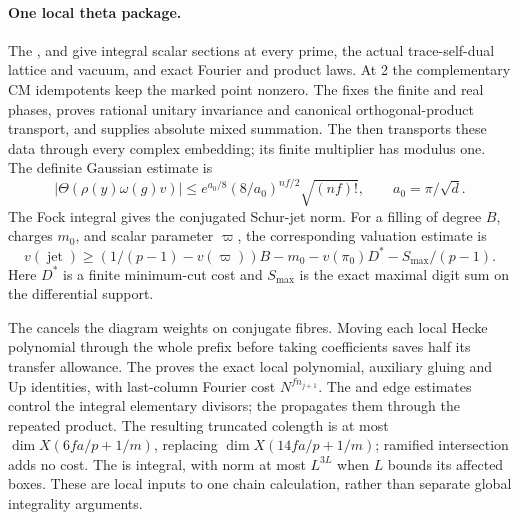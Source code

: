 \paragraph{One local theta package.}
The ,
and 
give integral scalar sections at every prime, the actual trace-self-dual
lattice and vacuum, and exact Fourier and product laws. At 2 the
complementary CM idempotents keep the marked point nonzero.
The 
fixes the finite and real phases, proves rational unitary invariance and
canonical orthogonal-product transport, and supplies absolute mixed
summation. The
then transports these data through every complex embedding; its finite
multiplier has modulus one. The definite Gaussian estimate is
\[
 |\Theta(\rho(y)\omega(g)v)|
 \le e^{a_0/8}(8/a_0)^{nf/2}\sqrt{(nf)!},
 \qquad a_0=\pi/\sqrt d.
\]
The Fock integral gives the conjugated Schur-jet norm. For a filling of
degree \(B\), charges \(m_0\), and scalar parameter \(\varpi\), the
corresponding valuation estimate is
\[
 v(\operatorname{jet})\ge
 (1/(p-1)-v(\varpi))B-m_0-v(\pi_0)D^*
                    -S_{\max}/(p-1).
\]
Here \(D^*\) is a finite minimum-cut cost and \(S_{\max}\) is the
exact maximal digit sum on the differential support.

The 
cancels the diagram weights on conjugate fibres. Moving each local
Hecke polynomial through the whole prefix before taking coefficients
saves half its transfer allowance. The
proves the exact local polynomial, auxiliary gluing and Up identities,
with last-column Fourier cost \(N^{fn_{j+1}}\).
The 
and 
edge estimates control the integral elementary divisors; the
propagates them through the repeated product. The resulting truncated
colength is at most \(\dim X(6fa/p+1/m)\), replacing
\(\dim X(14fa/p+1/m)\); ramified intersection adds no cost.
The  is integral, with norm at most \(L^{3L}\) when
\(L\) bounds its affected boxes. These are local inputs to one
chain calculation, rather than separate global integrality arguments.

